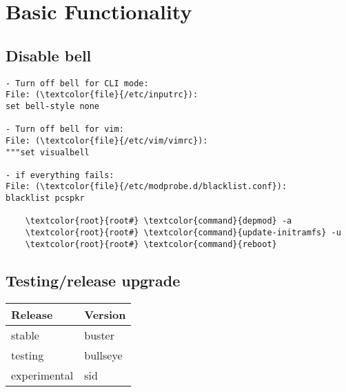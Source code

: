 \documentclass[10pt, a4paper, onecolumn, openany]{book} %
\begin{document}
\chapter{Basic Functionality}
\section{Disable bell}
\begin{Verbatim}[commandchars=\\\{\}]
- Turn off bell for CLI mode:
File: (\textcolor{file}{/etc/inputrc}):
set bell-style none

- Turn off bell for vim:
File: (\textcolor{file}{/etc/vim/vimrc}):
"""set visualbell

- if everything fails:
File: (\textcolor{file}{/etc/modprobe.d/blacklist.conf}):
blacklist pcspkr

    \textcolor{root}{root#} \textcolor{command}{depmod} -a
    \textcolor{root}{root#} \textcolor{command}{update-initramfs} -u
    \textcolor{root}{root#} \textcolor{command}{reboot}
\end{Verbatim}


\section{Testing/release upgrade}
\begin{center}
    \begin{small}
    \begin{tabular}{|p{4cm}|p{4cm}|}
    \hline
    \textbf{Release} & \textbf{Version} \\
    \hline
    stable & buster \\
    \hline
    testing & bullseye \\
    \hline
    experimental & sid \\
    \hline
    \end{tabular}
    \end{small}
\end{center}
\end{document}
